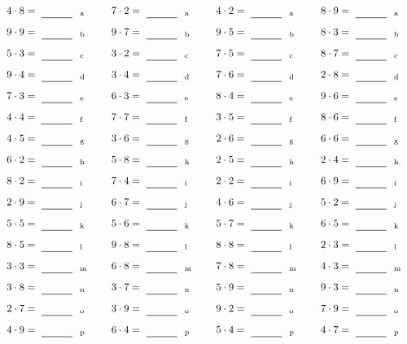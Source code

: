 \documentclass
[
  draft    = true,
  fontsize = 11pt,
  parskip  = half-
]
{scrartcl}
\begin{document}
\par\vfill\par
\begin{align*}
    \pline{4\cdot8}&=\rline{a}
  & \pline{7\cdot2}&=\rline{a}
  & \pline{4\cdot2}&=\rline{a}
  & \pline{8\cdot9}&=\rline{a} \\[1ex]
    \pline{9\cdot9}&=\rline{b}
  & \pline{9\cdot7}&=\rline{b}
  & \pline{9\cdot5}&=\rline{b}
  & \pline{8\cdot3}&=\rline{b} \\[1ex]
    \pline{5\cdot3}&=\rline{c}
  & \pline{3\cdot2}&=\rline{c}
  & \pline{7\cdot5}&=\rline{c}
  & \pline{8\cdot7}&=\rline{c} \\[1ex]
    \pline{9\cdot4}&=\rline{d}
  & \pline{3\cdot4}&=\rline{d}
  & \pline{7\cdot6}&=\rline{d}
  & \pline{2\cdot8}&=\rline{d} \\[1ex]
    \pline{7\cdot3}&=\rline{e}
  & \pline{6\cdot3}&=\rline{e}
  & \pline{8\cdot4}&=\rline{e}
  & \pline{9\cdot6}&=\rline{e} \\[1ex]
    \pline{4\cdot4}&=\rline{f}
  & \pline{7\cdot7}&=\rline{f}
  & \pline{3\cdot5}&=\rline{f}
  & \pline{8\cdot6}&=\rline{f} \\[1ex]
    \pline{4\cdot5}&=\rline{g}
  & \pline{3\cdot6}&=\rline{g}
  & \pline{2\cdot6}&=\rline{g}
  & \pline{6\cdot6}&=\rline{g} \\[1ex]
    \pline{6\cdot2}&=\rline{h}
  & \pline{5\cdot8}&=\rline{h}
  & \pline{2\cdot5}&=\rline{h}
  & \pline{2\cdot4}&=\rline{h} \\[1ex]
    \pline{8\cdot2}&=\rline{i}
  & \pline{7\cdot4}&=\rline{i}
  & \pline{2\cdot2}&=\rline{i}
  & \pline{6\cdot9}&=\rline{i} \\[1ex]
    \pline{2\cdot9}&=\rline{j}
  & \pline{6\cdot7}&=\rline{j}
  & \pline{4\cdot6}&=\rline{j}
  & \pline{5\cdot2}&=\rline{j} \\[1ex]
    \pline{5\cdot5}&=\rline{k}
  & \pline{5\cdot6}&=\rline{k}
  & \pline{5\cdot7}&=\rline{k}
  & \pline{6\cdot5}&=\rline{k} \\[1ex]
    \pline{8\cdot5}&=\rline{l}
  & \pline{9\cdot8}&=\rline{l}
  & \pline{8\cdot8}&=\rline{l}
  & \pline{2\cdot3}&=\rline{l} \\[1ex]
    \pline{3\cdot3}&=\rline{m}
  & \pline{6\cdot8}&=\rline{m}
  & \pline{7\cdot8}&=\rline{m}
  & \pline{4\cdot3}&=\rline{m} \\[1ex]
    \pline{3\cdot8}&=\rline{n}
  & \pline{3\cdot7}&=\rline{n}
  & \pline{5\cdot9}&=\rline{n}
  & \pline{9\cdot3}&=\rline{n} \\[1ex]
    \pline{2\cdot7}&=\rline{o}
  & \pline{3\cdot9}&=\rline{o}
  & \pline{9\cdot2}&=\rline{o}
  & \pline{7\cdot9}&=\rline{o} \\[1ex]
    \pline{4\cdot9}&=\rline{p}
  & \pline{6\cdot4}&=\rline{p}
  & \pline{5\cdot4}&=\rline{p}
  & \pline{4\cdot7}&=\rline{p}
\end{align*}
\end{document}
